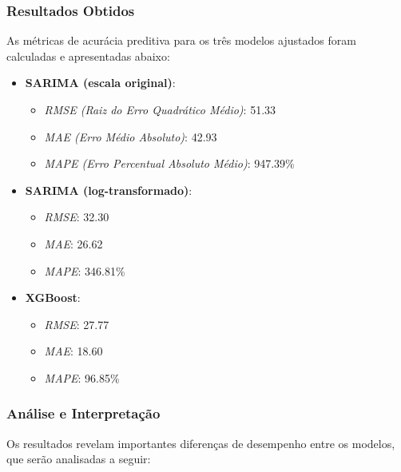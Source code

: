 \documentclass[a4paper, 12pt]{article}
\begin{document}
\subsubsection{Resultados Obtidos}
As métricas de acurácia preditiva para os três modelos ajustados foram calculadas e apresentadas abaixo:

\begin{itemize}
    \item \textbf{SARIMA (escala original)}:
    \begin{itemize}
        \item \textit{RMSE (Raiz do Erro Quadrático Médio)}: 51.33
        \item \textit{MAE (Erro Médio Absoluto)}: 42.93
        \item \textit{MAPE (Erro Percentual Absoluto Médio)}: 947.39\%
    \end{itemize}
    \item \textbf{SARIMA (log-transformado)}:
    \begin{itemize}
        \item \textit{RMSE}: 32.30
        \item \textit{MAE}: 26.62
        \item \textit{MAPE}: 346.81\%
    \end{itemize}
    \item \textbf{XGBoost}:
    \begin{itemize}
        \item \textit{RMSE}: 27.77
        \item \textit{MAE}: 18.60
        \item \textit{MAPE}: 96.85\%
    \end{itemize}
\end{itemize}

\subsubsection{Análise e Interpretação}
Os resultados revelam importantes diferenças de desempenho entre os modelos, que serão analisadas a seguir:
\end{document}
